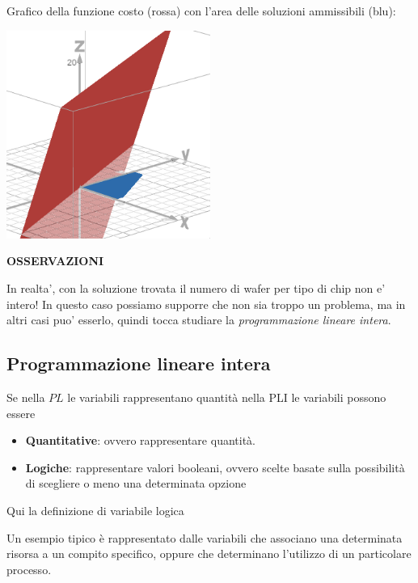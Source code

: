 {\begin{itemize}
      Grafico della funzione costo (rossa) con l'area delle soluzioni ammissibili (blu):
      \begin{center}
        \includegraphics[width=0.5\textwidth]{img/2025-03-03-12-50-44.png}
      \end{center}

      \textbf{OSSERVAZIONI}

      In realta', con la soluzione trovata il numero di wafer per tipo di chip non e' intero! In questo caso possiamo supporre che non sia troppo un problema, ma in altri casi puo' esserlo, quindi tocca studiare la \textit{programmazione lineare intera}.

 \end{itemize}

}

\subsection{Programmazione lineare intera}
Se nella $PL$ le variabili rappresentano quantità nella PLI le variabili possono essere
\begin{itemize}
  \item \textbf{Quantitative}: ovvero rappresentare quantità.
  \item \textbf{Logiche}: rappresentare valori booleani, ovvero scelte basate sulla possibilità di scegliere o meno una determinata opzione
\end{itemize}

Qui la definizione di variabile logica


Un esempio tipico è rappresentato dalle variabili che associano una determinata risorsa a un compito specifico, oppure che determinano l'utilizzo di un particolare processo.

